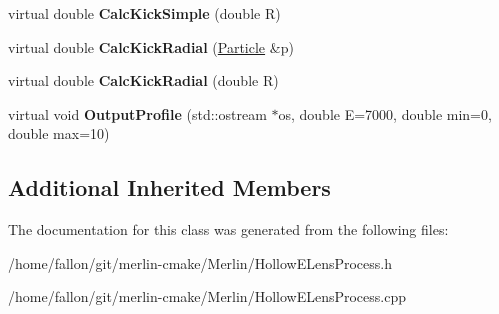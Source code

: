 \begin{DoxyCompactItemize}
virtual double {\bfseries Calc\+Kick\+Simple} (double R)
\item 
\mbox{\label{classParticleTracking_1_1HollowELensProcess_a0aebf79890a6212f9dd8eaacf4beff37}} 
virtual double {\bfseries Calc\+Kick\+Radial} (\hyperlink{classPSvector}{Particle} \&p)
\item 
\mbox{\label{classParticleTracking_1_1HollowELensProcess_ab54b9f25e2f3a14093b5ec01e1bbea13}} 
virtual double {\bfseries Calc\+Kick\+Radial} (double R)
\item 
\mbox{\label{classParticleTracking_1_1HollowELensProcess_a7259cd1c58e8957b2adee90ab608855e}} 
virtual void {\bfseries Output\+Profile} (std\+::ostream $\ast$os, double E=7000, double min=0, double max=10)
\end{DoxyCompactItemize}
\subsection*{Additional Inherited Members}


The documentation for this class was generated from the following files\+:\begin{DoxyCompactItemize}
\item 
/home/fallon/git/merlin-\/cmake/\+Merlin/Hollow\+E\+Lens\+Process.\+h\item 
/home/fallon/git/merlin-\/cmake/\+Merlin/Hollow\+E\+Lens\+Process.\+cpp\end{DoxyCompactItemize}
